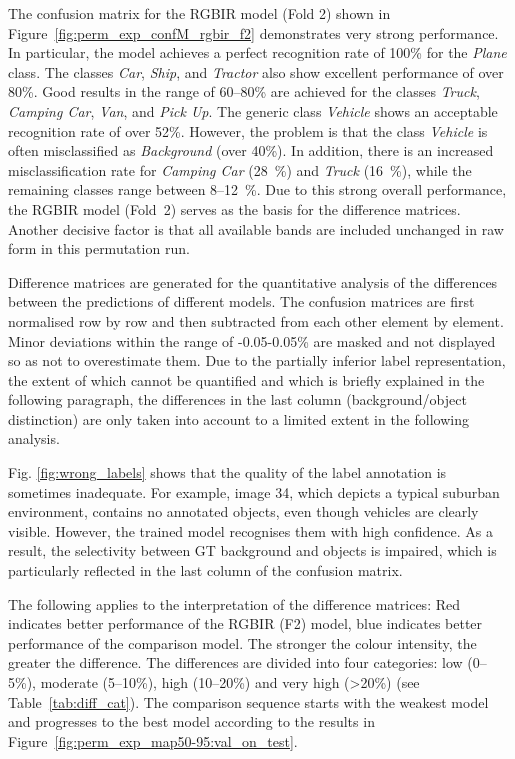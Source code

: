 The confusion matrix for the RGBIR model (Fold 2) shown in Figure~\ref{fig:perm_exp_confM_rgbir_f2} demonstrates very strong performance. In particular, the model achieves a perfect recognition rate of 100\% for the \textit{Plane} class. The classes \textit{Car}, \textit{Ship}, and \textit{Tractor} also show excellent performance of over 80\%. Good results in the range of 60–80\% are achieved for the classes \textit{Truck}, \textit{Camping Car}, \textit{Van}, and \textit{Pick Up}. The generic class \textit{Vehicle} shows an acceptable recognition rate of over 52\%. However, the problem is that the class \textit{Vehicle} is often misclassified as \textit{Background} (over 40\%). In addition, there is an increased misclassification rate for \textit{Camping Car} (28~\%) and \textit{Truck} (16~\%), while the remaining classes range between 8–12~\%. Due to this strong overall performance, the RGBIR model (Fold~2) serves as the basis for the difference matrices. Another decisive factor is that all available bands are included unchanged in raw form in this permutation run.

Difference matrices are generated for the quantitative analysis of the differences between the predictions of different models. The confusion matrices are first normalised row by row and then subtracted from each other element by element. Minor deviations within the range of -0.05-0.05\% are masked and not displayed so as not to overestimate them. Due to the partially inferior label representation, the extent of which cannot be quantified and which is briefly explained in the following paragraph, the differences in the last column (background/object distinction) are only taken into account to a limited extent in the following analysis.

Fig. \ref{fig:wrong_labels} shows that the quality of the label annotation is sometimes inadequate. For example, image 34, which depicts a typical suburban environment, contains no annotated objects, even though vehicles are clearly visible. However, the trained model recognises them with high confidence. As a result, the selectivity between \acrshort{GT} background and objects is impaired, which is particularly reflected in the last column of the confusion matrix.

The following applies to the interpretation of the difference matrices: Red indicates better performance of the RGBIR (F2) model, blue indicates better performance of the comparison model. The stronger the colour intensity, the greater the difference. The differences are divided into four categories: low (0–5\%), moderate (5–10\%), high (10–20\%) and very high (>20\%) (see Table~\ref{tab:diff_cat}). The comparison sequence starts with the weakest model and progresses to the best model according to the results in Figure~\ref{fig:perm_exp_map50-95:val_on_test}.



